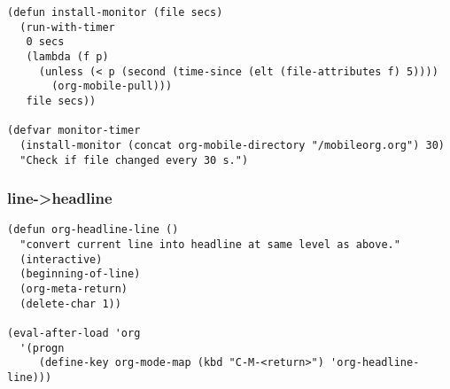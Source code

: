 \documentclass[nofonts]{tufte-handout}
\begin{document}
\begin{verbatim}
(defun install-monitor (file secs)
  (run-with-timer
   0 secs
   (lambda (f p)
     (unless (< p (second (time-since (elt (file-attributes f) 5))))
       (org-mobile-pull)))
   file secs))

(defvar monitor-timer
  (install-monitor (concat org-mobile-directory "/mobileorg.org") 30)
  "Check if file changed every 30 s.")
\end{verbatim}
\subsubsection{line->headline}
\label{sec-2-5-7}

\begin{verbatim}
(defun org-headline-line ()
  "convert current line into headline at same level as above."
  (interactive)
  (beginning-of-line)
  (org-meta-return)
  (delete-char 1))

(eval-after-load 'org
  '(progn
     (define-key org-mode-map (kbd "C-M-<return>") 'org-headline-line)))
\end{verbatim}
\end{document}
